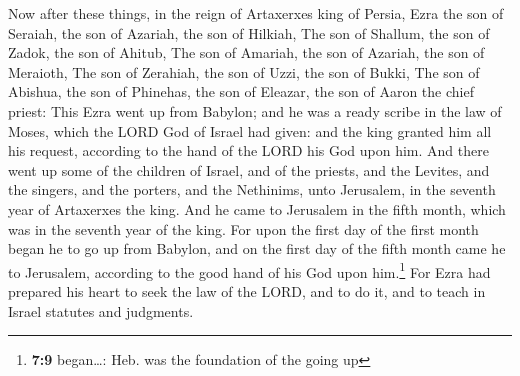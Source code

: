  Now after these things, in the reign of Artaxerxes king
of Persia, Ezra the son of Seraiah, the son of Azariah, the son of
Hilkiah,  The son of Shallum, the son of Zadok, the son of
Ahitub,  The son of Amariah, the son of Azariah, the son
of Meraioth,  The son of Zerahiah, the son of Uzzi, the
son of Bukki,  The son of Abishua, the son of Phinehas,
the son of Eleazar, the son of Aaron the chief priest: 
This Ezra went up from Babylon; and he was a ready scribe in the law of
Moses, which the LORD God of Israel had given: and the king granted him
all his request, according to the hand of the LORD his God upon him.
 And there went up some of the children of Israel, and of
the priests, and the Levites, and the singers, and the porters, and the
Nethinims, unto Jerusalem, in the seventh year of Artaxerxes the king.
 And he came to Jerusalem in the fifth month, which was in
the seventh year of the king.  For upon the first day of
the first month began he to go up from Babylon, and on the first day of
the fifth month came he to Jerusalem, according to the good hand of his
God upon him.\footnote{\textbf{7:9} began\ldots: Heb. was the foundation
  of the going up}  For Ezra had prepared his heart to
seek the law of the LORD, and to do it, and to teach in Israel statutes
and judgments.

